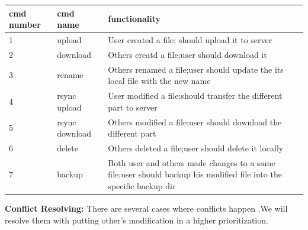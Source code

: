 \documentclass{article}
\begin{document}
\begin{center}
\begin{tabular}{ | m{1.5cm}| m{2cm} | m{7cm}|}
\hline
\textbf{cmd number} & \textbf{cmd name} & \textbf{functionality}  \\
\hline
1 & upload & User created a file; should upload it to server  \\
\hline
2 & download & Others creatd a file;user should download it \\
\hline
3 & rename & Others renamed a file;user should update the its local file with the new name \\
\hline
4 & rsync upload & User modified a file;should transfer the different part to server \\
\hline
5 & rsync download & Others modified a file;user should download the different part \\
\hline
6 & delete & Others deleted a file;user should delete it locally \\
\hline
7 & backup & Both user and others made changes to a same file;user should backup his modified file into the specific backup dir \\
\hline
\end{tabular}
\end{center}

\newpage
\textbf{Conflict Resolving:}
\newline
\hfill \break
There are several cases where conflicts happen .We will resolve them with putting other’s modification in a higher prioritization.
\end{document}
